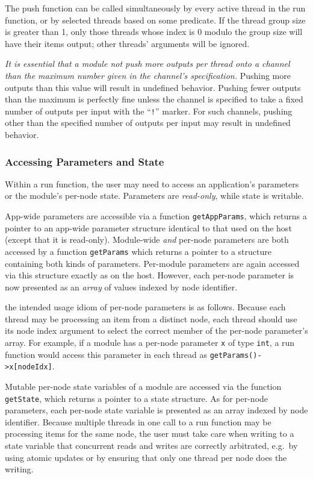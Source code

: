 \documentclass[11pt]{article}
\begin{document}
The push function can be called simultaneously by every active thread
in the run function, or by selected threads based on some predicate.
If the thread group size is greater than 1, only those threads whose
index is 0 modulo the group size will have their items output; other
threads' arguments will be ignored.

\emph{It is essential that a module not push more outputs per thread
  onto a channel than the maximum number given in the channel's
  specification.}  Pushing more outputs than this value will result in
undefined behavior.  Pushing fewer outputs than the maximum is
perfectly fine unless the channel is specified to take a fixed number
of outputs per input with the ``\texttt{!}'' marker. For such
channels, pushing other than the specified number of outputs per input
may result in undefined behavior.

\subsubsection{Accessing Parameters and State}

Within a run function, the user may need to access an application's
parameters or the module's per-node state.  Parameters are
\emph{read-only}, while state is writable.

App-wide parameters are accessible via a function
\texttt{getAppParams}, which returns a pointer to an app-wide
parameter structure identical to that used on the host (except that it
is read-only).  Module-wide \emph{and} per-node parameters are both
accessed by a function \texttt{getParams} which returns a pointer to a
structure containing both kinds of parameters.  Per-module parameters
are again accessed via this structure exactly as on the host.  However,
each per-node parameter is now presented as an \emph{array} of values
indexed by node identifier.

the intended usage idiom of per-node parameters is as follows.
Because each thread may be processing an item from a distinct node,
each thread should use its node index argument to select the correct
member of the per-node parameter's array.  For example, if a module
has a per-node parameter \texttt{x} of type \texttt{int}, a run
function would access this parameter in each thread as
\texttt{getParams()->x[nodeIdx]}.

Mutable per-node state variables of a module are accessed via the
function \texttt{getState}, which returns a pointer to a state
structure.  As for per-node parameters, each per-node state variable
is presented as an array indexed by node identifier.  Because multiple
threads in one call to a run function may be processing items for the
same node, the user must take care when writing to a state variable
that concurrent reads and writes are correctly arbitrated, e.g.\ by
using atomic updates or by ensuring that only one thread per node does
the writing.
\end{document}
